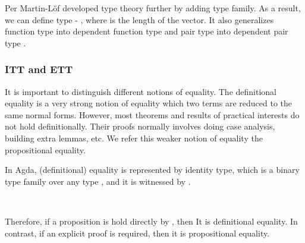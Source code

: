 Per Martin-L\"{o}f developed type theory further by adding type family. As a result, we can define type -  , where  is the length of the vector. It also generalizes function type  into dependent function type  and pair type  into dependent pair type .

\subsubsection*{ITT and ETT}

It is important to distinguish different notions of equality. The definitional equality is a very strong notion of equality which two terms are reduced to the same normal forms. However, most theorems and results of practical interests do not hold definitionally. Their proofs normally involves doing case analysis, building extra lemmas, etc. We refer this weaker notion of equality the propositional equality.

In Agda, (definitional) equality is represented by identity type, which is a binary type family over any type , and it is witnessed by .

\begin{code}%
\>[0]\AgdaSpace{}%
\AgdaSpace{}%
\AgdaSymbol{\{}\AgdaSpace{}%
\AgdaSymbol{:}\AgdaSpace{}%
\AgdaSymbol{\}}\AgdaSpace{}%
\AgdaSymbol{(}\AgdaSpace{}%
\AgdaSymbol{:}\AgdaSpace{}%
\AgdaSymbol{)}\AgdaSpace{}%
\AgdaSymbol{:}\AgdaSpace{}%
\AgdaSpace{}%
\AgdaSpace{}%
\AgdaSpace{}%
\<%
\\
\>[0][@{}l@{\AgdaIndent{0}}]%
\>[2]\AgdaSpace{}%
\AgdaSymbol{:}\AgdaSpace{}%
\AgdaSpace{}%
\AgdaSpace{}%
\<%
\end{code}

Therefore, if a proposition is hold directly by , then It is definitional equality. In contrast, if an explicit proof is required, then it is propositional equality.


